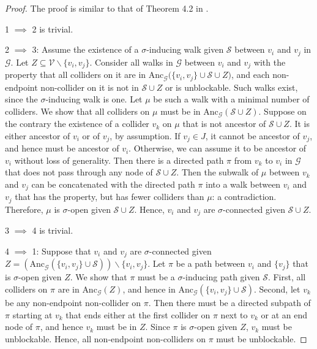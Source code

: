 \documentclass[accepted]{uai2025} %
\newcommand{\anc}{\text{Anc}}
\begin{document}
\begin{proof}
The proof is similar to that of Theorem 4.2 in \citep{richardson2002ancestral}.

  1 $\implies$ 2 is trivial.

  2 $\implies$ 3: Assume the existence of a $\sigma$-inducing walk given $\mathcal{S}$ between $v_i$ and $v_j$ in $\mathcal{G}$. 
  Let $Z \subseteq \mathcal{V}  \backslash\{v_i,v_j\}$. 
  Consider all walks in $\mathcal{G}$ between $v_i$ and $v_j$ with the property that all colliders on it are in $\anc_{\mathcal{G}}({\{v_i,v_j\} \cup \mathcal{S} \cup Z)}$, and each non-endpoint non-collider on it is not in $\mathcal{S} \cup Z$ or is unblockable.
  Such walks exist, since the $\sigma$-inducing walk is one. 
  Let $\mu$ be such a walk with a minimal number of colliders.
  We show that all colliders on $\mu$ must be in $\anc_{\mathcal{G}}(\mathcal{S} \cup Z)$. 
  Suppose on the contrary the existence of a collider $v_k$ on $\mu$ that is not ancestor of $\mathcal{S} \cup Z$.
  It is either ancestor of $v_i$ or of $v_j$, by assumption.
  If $v_j \in J$, it cannot be ancestor of $v_j$, and hence must be ancestor of $v_i$.
  Otherwise, we can assume it to be ancestor of $v_i$ without loss of generality.
  Then there is a directed path $\pi$ from $v_k$ to $v_i$ in $\mathcal{G}$ that does not pass through any node of $\mathcal{S} \cup Z$.
  Then the subwalk of $\mu$ between $v_k$ and $v_j$ can be concatenated with the directed path $\pi$
  into a walk between $v_i$ and $v_j$ that has the property, but has fewer colliders than $\mu$: a contradiction. 
  Therefore, $\mu$ is $\sigma$-open given $\mathcal{S} \cup Z$.
  Hence, $v_i$ and $v_j$ are $\sigma$-connected given $\mathcal{S} \cup Z$.

  3 $\implies$ 4 is trivial.

  4 $\implies$ 1:
  Suppose that %
  $v_i$ and $v_j$ are $\sigma$-connected given $Z = (\anc_{\mathcal{G}}(\{v_i,v_j\} \cup \mathcal{S}) ) \backslash \{v_i,v_j\}$. 
  Let $\pi$ be a path between $v_i$ and $\{v_j\}$ that is $\sigma$-open given $Z$. %
  We show that $\pi$ must be a $\sigma$-inducing path given $\mathcal{S}$. 
  First, all colliders on $\pi$ are in $\anc_\mathcal{G}(Z)$, and hence in $\anc_{\mathcal{G}}(\{v_i,v_j\} \cup \mathcal{S})$.
  Second, let $v_k$ be any non-endpoint non-collider on $\pi$.
  Then there must be a directed subpath of $\pi$ starting at $v_k$ that ends either at the first collider on $\pi$ next to $v_k$ or at an end node of $\pi$, and hence $v_k$ must be in $Z$. 
  Since $\pi$ is $\sigma$-open given $Z$, $v_k$ must be unblockable.
  Hence, all non-endpoint non-colliders on $\pi$ must be unblockable.
\end{proof}
\end{document}
